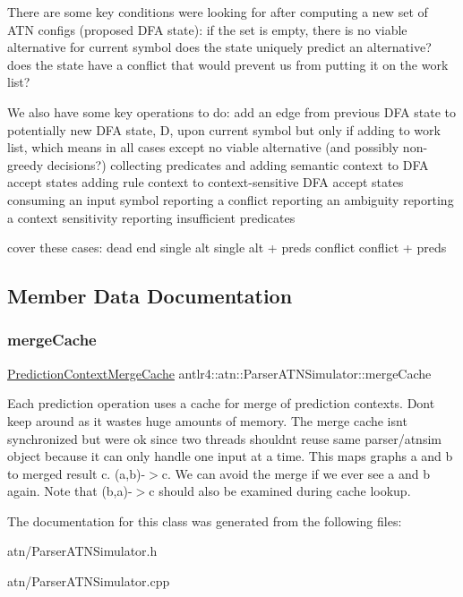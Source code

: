 There are some key conditions we\textquotesingle{}re looking for after computing a new set of A\+TN configs (proposed D\+FA state)\+: if the set is empty, there is no viable alternative for current symbol does the state uniquely predict an alternative? does the state have a conflict that would prevent us from putting it on the work list?

We also have some key operations to do\+: add an edge from previous D\+FA state to potentially new D\+FA state, D, upon current symbol but only if adding to work list, which means in all cases except no viable alternative (and possibly non-\/greedy decisions?) collecting predicates and adding semantic context to D\+FA accept states adding rule context to context-\/sensitive D\+FA accept states consuming an input symbol reporting a conflict reporting an ambiguity reporting a context sensitivity reporting insufficient predicates

cover these cases\+: dead end single alt single alt + preds conflict conflict + preds 

\subsection{Member Data Documentation}
\mbox{\label{classantlr4_1_1atn_1_1ParserATNSimulator_aa4d885910cc6f113c761a232d297e8e4}} 
\subsubsection{\texorpdfstring{merge\+Cache}{mergeCache}}
{\footnotesize\ttfamily \hyperlink{classantlr4_1_1atn_1_1PredictionContextMergeCache}{Prediction\+Context\+Merge\+Cache} antlr4\+::atn\+::\+Parser\+A\+T\+N\+Simulator\+::merge\+Cache\hspace{0.3cm}{\ttfamily [protected]}}



Each prediction operation uses a cache for merge of prediction contexts. Don\textquotesingle{}t keep around as it wastes huge amounts of memory. The merge cache isn\textquotesingle{}t synchronized but we\textquotesingle{}re ok since two threads shouldn\textquotesingle{}t reuse same parser/atnsim object because it can only handle one input at a time. This maps graphs a and b to merged result c. (a,b)-\/$>$c. We can avoid the merge if we ever see a and b again. Note that (b,a)-\/$>$c should also be examined during cache lookup. 



The documentation for this class was generated from the following files\+:\begin{DoxyCompactItemize}
\item 
atn/Parser\+A\+T\+N\+Simulator.\+h\item 
atn/Parser\+A\+T\+N\+Simulator.\+cpp\end{DoxyCompactItemize}
